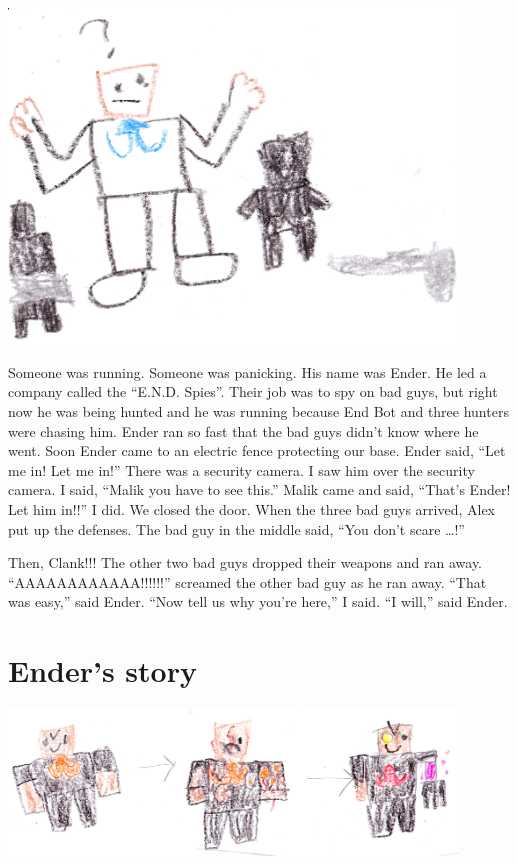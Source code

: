 \documentclass[booklet, twoside, 12pt]{krantz}
\begin{document}
\includegraphics[width=4.6875in,height=\textheight]{img/four-bad-guys/scared.jpg}

Someone was running. Someone was panicking. His name was Ender. He led a
company called the ``E.N.D. Spies''. Their job was to spy on bad guys,
but right now he was being hunted and he was running because End Bot and
three hunters were chasing him. Ender ran so fast that the bad guys
didn't know where he went. Soon Ender came to an electric fence
protecting our base. Ender said, ``Let me in! Let me in!'' There was a
security camera. I saw him over the security camera. I said, ``Malik you
have to see this.'' Malik came and said, ``That's Ender! Let him in!!''
I did. We closed the door. When the three bad guys arrived, Alex put up
the defenses. The bad guy in the middle said, ``You don't scare
\ldots{}!''

Then, Clank!!! The other two bad guys dropped their weapons and ran
away. ``AAAAAAAAAAAA!!!!!!'' screamed the other bad guy as he ran away.
``That was easy,'' said Ender. ``Now tell us why you're here,'' I said.
``I will,'' said Ender.

\hypertarget{enders-story}{%
\section{Ender's story}\label{enders-story}}

\includegraphics[width=4.6875in,height=\textheight]{img/four-bad-guys/armstrong.jpg}
\end{document}
